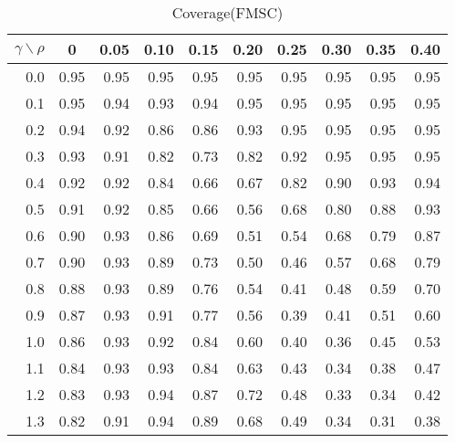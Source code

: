 \documentclass[12pt]{article}
\begin{document}
%
\begin{table}[!tbp]
\caption{Coverage(FMSC)}
 \begin{center}
 \begin{tabular}{r|rrrrrrrrr}\hline\hline
\multicolumn{1}{c|}{$\gamma\backslash\rho$}&\multicolumn{1}{c}{0}&\multicolumn{1}{c}{0.05}&\multicolumn{1}{c}{0.10}&\multicolumn{1}{c}{0.15}&\multicolumn{1}{c}{0.20}&\multicolumn{1}{c}{0.25}&\multicolumn{1}{c}{0.30}&\multicolumn{1}{c}{0.35}&\multicolumn{1}{c}{0.40}\tabularnewline
\hline

0.0&0.95&0.95&0.95&0.95&0.95&0.95&0.95&0.95&0.95\tabularnewline
0.1&0.95&0.94&0.93&0.94&0.95&0.95&0.95&0.95&0.95\tabularnewline
0.2&0.94&0.92&0.86&0.86&0.93&0.95&0.95&0.95&0.95\tabularnewline
0.3&0.93&0.91&0.82&0.73&0.82&0.92&0.95&0.95&0.95\tabularnewline
0.4&0.92&0.92&0.84&0.66&0.67&0.82&0.90&0.93&0.94\tabularnewline
0.5&0.91&0.92&0.85&0.66&0.56&0.68&0.80&0.88&0.93\tabularnewline
0.6&0.90&0.93&0.86&0.69&0.51&0.54&0.68&0.79&0.87\tabularnewline
0.7&0.90&0.93&0.89&0.73&0.50&0.46&0.57&0.68&0.79\tabularnewline
0.8&0.88&0.93&0.89&0.76&0.54&0.41&0.48&0.59&0.70\tabularnewline
0.9&0.87&0.93&0.91&0.77&0.56&0.39&0.41&0.51&0.60\tabularnewline
1.0&0.86&0.93&0.92&0.84&0.60&0.40&0.36&0.45&0.53\tabularnewline
1.1&0.84&0.93&0.93&0.84&0.63&0.43&0.34&0.38&0.47\tabularnewline
1.2&0.83&0.93&0.94&0.87&0.72&0.48&0.33&0.34&0.42\tabularnewline
1.3&0.82&0.91&0.94&0.89&0.68&0.49&0.34&0.31&0.38\tabularnewline
\hline
\end{tabular}

\end{center}

\end{table}
\end{document}
